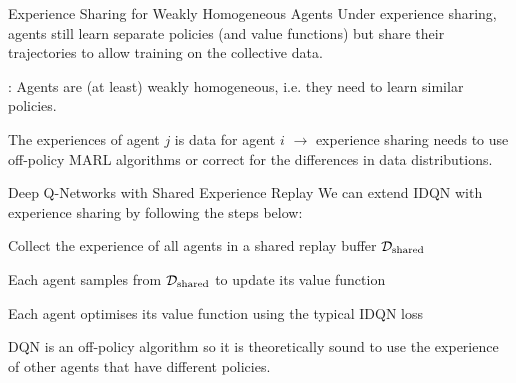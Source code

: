 %
%
%
%

\begin{frame}[t]{Experience Sharing for Weakly Homogeneous Agents}
    Under experience sharing, agents still learn separate policies (and value functions) but share their trajectories to allow training on the collective data.

    \pause

    : Agents are (at least) weakly homogeneous, i.e. they need to learn similar policies.

    \pause

    \begin{notebox}
        The experiences of agent $j$ is  data for agent $i$ $\rightarrow$ experience sharing needs to use off-policy MARL algorithms or correct for the differences in data distributions.
    \end{notebox}
\end{frame}

\begin{frame}[t]{Deep Q-Networks with Shared Experience Replay}
    We can extend IDQN with experience sharing by following the steps below:
    \blist
        \item Collect the experience of all agents in a shared replay buffer $\mathcal{D}_{\text{shared}}$
        \item Each agent samples from $\mathcal{D}_{\text{shared}}$ to update its value function
        \item Each agent optimises its value function using the typical IDQN loss
    \elist

    \pause

    \begin{notebox}
        DQN is an off-policy algorithm so it is theoretically sound to use the experience of other agents that have different policies.
    \end{notebox}
\end{frame}

